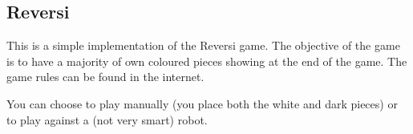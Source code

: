 \subsection{Reversi}

This is a simple implementation of the Reversi game. The objective of
the game is to have a majority of own coloured pieces showing at the end
of the game. The game rules can be found in the internet.

You can choose to play manually (you place both the white and dark pieces)
or to play against a (not very smart) robot.
